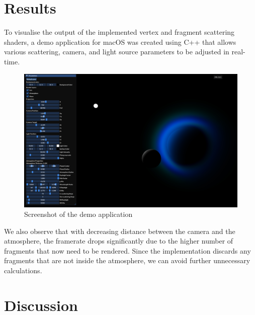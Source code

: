 \documentclass[12pt]{article}
\begin{document}
\section{Results}
To visualise the output of the implemented vertex and fragment scattering shaders, a demo application for macOS was created using C++ that allows various scattering, camera, and light source parameters to be adjusted in real-time.
\begin{figure}[h!]
    \centering
    \includegraphics[width=1.0\textwidth]{./figures/demo.jpg}
    \caption{Screenshot of the demo application}
    \label{fig:occlusion}
\end{figure}
We also observe that with decreasing distance between the camera and the atmosphere, the framerate drops significantly due to the higher number of fragments that now need to  be rendered. Since the implementation discards any fragments that are not inside the atmosphere, we can avoid further unnecessary calculations.
\section{Discussion}
\newpage
\printbibliography
\newpage
\appendix
\begin{appendices}

\end{appendices}
\end{document}
